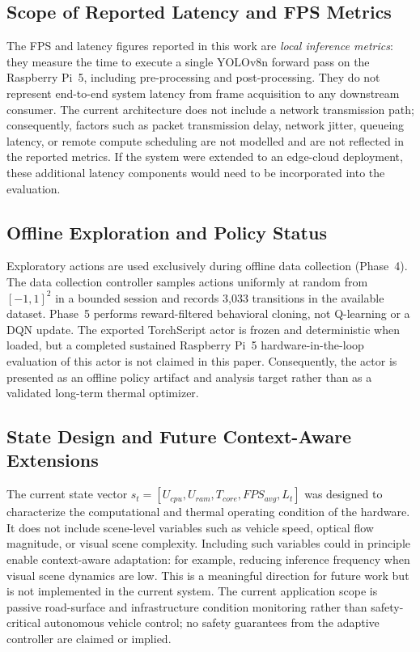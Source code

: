 \documentclass{ieeeaccess}
\begin{document}
\subsection{Scope of Reported Latency and FPS Metrics}

The FPS and latency figures reported in this work are \emph{local inference
metrics}: they measure the time to execute a single YOLOv8n forward pass on
the Raspberry Pi~5, including pre-processing and post-processing. They do
not represent end-to-end system latency from frame acquisition to any
downstream consumer. The current architecture does not include a network
transmission path; consequently, factors such as packet transmission delay,
network jitter, queueing latency, or remote compute scheduling are not
modelled and are not reflected in the reported metrics. If the system were
extended to an edge-cloud deployment, these additional latency components
would need to be incorporated into the evaluation.

\subsection{Offline Exploration and Policy Status}

Exploratory actions are used exclusively during offline data collection
(Phase~4). The data collection controller samples actions uniformly at random
from $[-1,1]^2$ in a bounded session and records 3,033 transitions in the
available dataset. Phase~5 performs reward-filtered behavioral cloning, not
Q-learning or a DQN update. The exported TorchScript actor is frozen and
deterministic when loaded, but a completed sustained Raspberry Pi~5
hardware-in-the-loop evaluation of this actor is not claimed in this paper.
Consequently, the actor is presented as an offline policy artifact and
analysis target rather than as a validated long-term thermal optimizer.

\subsection{State Design and Future Context-Aware Extensions}

The current state vector $s_t = [U_{cpu}, U_{ram}, T_{core}, FPS_{avg},
L_t]$ was designed to characterize the computational and thermal operating
condition of the hardware. It does not include scene-level variables such
as vehicle speed, optical flow magnitude, or visual scene complexity.
Including such variables could in principle enable context-aware adaptation:
for example, reducing inference frequency when visual scene dynamics are low.
This is a meaningful direction for future work but is not implemented in the
current system. The current application scope is passive road-surface and
infrastructure condition monitoring rather than safety-critical autonomous
vehicle control; no safety guarantees from the adaptive controller are
claimed or implied.
\end{document}
